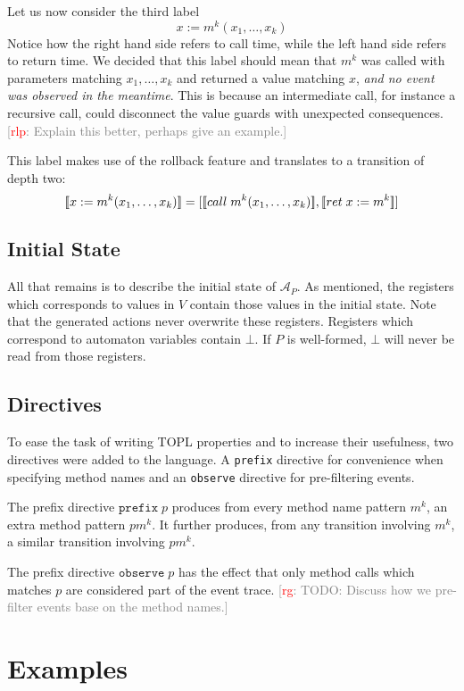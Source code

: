 \documentclass[9pt, preprint]{sigplanconf} %
\newcommand{\noterg}[2]{\textcolor{gray}{[\textcolor{red}{#1}: #2]}}
\newcommand{\rg}[1]{\noterg{rg}{#1}}
\newcommand{\rlp}[1]{\noterg{rlp}{#1}}
\newcommand{\A}{\ensuremath{\mathcal{A}}}
\theoremstyle{definition}
\theoremstyle{remark}
\begin{document}
Let us now consider the third label
\[
x := m^k(x_1, \ldots, x_k)
\]
Notice how the right hand side refers to call time, while the left
hand side refers to return time. We decided that this label should
mean that $m^k$ was called with parameters matching $x_1, \ldots, x_k$
and returned a value matching $x$, \emph{and no event was observed in
  the meantime}. This is because an intermediate call, for instance a
recursive call, could disconnect the value guards with unexpected
consequences. \rlp{Explain this better, perhaps give an example.}

This label makes use of the rollback feature and translates to a
transition of depth two:
\[
[\![x := m^k(x_1, \ldots, x_k)]\!]
=
[[\![call\;m^k(x_1, \ldots, x_k)]\!], [\![ret\;x := m^k]\!]]
\]

\subsection{Initial State}
All that remains is to describe the initial state of $\A_P$.
As mentioned, the registers which corresponds to values in $V$
contain those values in the initial state. Note that the generated
actions never overwrite these registers. Registers which correspond
to automaton variables contain $\bot$. If $P$ is well-formed, $\bot$
will never be read from those registers.

\subsection{Directives}
To ease the task of writing TOPL properties and to increase their
usefulness, two directives were added to the language. A \texttt{prefix}
directive for convenience when specifying method names and an
\texttt{observe} directive for pre-filtering events.

The prefix directive $\mathtt{prefix}\; p$ produces from every
method name pattern $m^k$, an extra method pattern $pm^k$. It further
produces, from any transition involving $m^k$, a similar transition
involving $pm^k$.

The prefix directive $\mathtt{observe}\; p$ has the effect that only
method calls which matches $p$ are considered part of the event trace.
\rg{TODO: Discuss how we pre-filter events base on the method names.}


\section{Examples} \label{sec:examples} %
\end{document}
